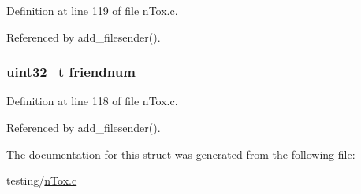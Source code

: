 Definition at line 119 of file n\+Tox.\+c.



Referenced by add\+\_\+filesender().

\hypertarget{struct_file___sender_af02b3246ba69ea99fddd081f6e95598f}{
\subsubsection[{friendnum}]{\setlength{\rightskip}{0pt plus 5cm}uint32\+\_\+t friendnum}}\label{struct_file___sender_af02b3246ba69ea99fddd081f6e95598f}


Definition at line 118 of file n\+Tox.\+c.



Referenced by add\+\_\+filesender().



The documentation for this struct was generated from the following file\+:\begin{DoxyCompactItemize}
\item 
testing/\hyperlink{n_tox_8c}{n\+Tox.\+c}\end{DoxyCompactItemize}
